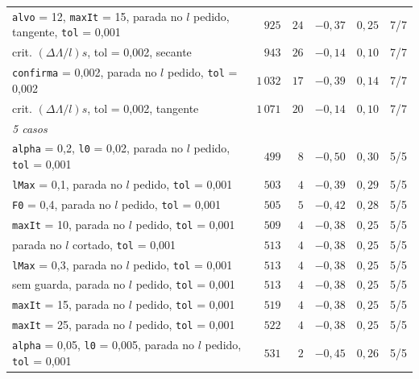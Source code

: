 \documentclass[11pt,a4paper]{article}
\numberwithin{equation}{section}
\begin{document}
{\begin{longtable}{p{7.8cm}rrrrc}
\texttt{alvo} = 12, \texttt{maxIt} = 15, parada no $l$ pedido, tangente, \texttt{tol} = 0,001 & $925$ & $24$ & $-0{,}37$ & $0{,}25$ & 7/7 \\
crit. $(\Delta\Lambda/l)s$, tol = 0,002, secante & $943$ & $26$ & $-0{,}14$ & $0{,}10$ & 7/7 \\
\texttt{confirma} = 0,002, parada no $l$ pedido, \texttt{tol} = 0,002 & $1\,032$ & $17$ & $-0{,}39$ & $0{,}14$ & 7/7 \\
crit. $(\Delta\Lambda/l)s$, tol = 0,002, tangente & $1\,071$ & $20$ & $-0{,}14$ & $0{,}10$ & 7/7 \\
\multicolumn{6}{l}{\textit{5 casos}} \\
\texttt{alpha} = 0,2, \texttt{l0} = 0,02, parada no $l$ pedido, \texttt{tol} = 0,001 & $499$ & $8$ & $-0{,}50$ & $0{,}30$ & 5/5 \\
\texttt{lMax} = 0,1, parada no $l$ pedido, \texttt{tol} = 0,001 & $503$ & $4$ & $-0{,}39$ & $0{,}29$ & 5/5 \\
\texttt{F0} = 0,4, parada no $l$ pedido, \texttt{tol} = 0,001 & $505$ & $5$ & $-0{,}42$ & $0{,}28$ & 5/5 \\
\texttt{maxIt} = 10, parada no $l$ pedido, \texttt{tol} = 0,001 & $509$ & $4$ & $-0{,}38$ & $0{,}25$ & 5/5 \\
parada no $l$ cortado, \texttt{tol} = 0,001 & $513$ & $4$ & $-0{,}38$ & $0{,}25$ & 5/5 \\
\texttt{lMax} = 0,3, parada no $l$ pedido, \texttt{tol} = 0,001 & $513$ & $4$ & $-0{,}38$ & $0{,}25$ & 5/5 \\
sem guarda, parada no $l$ pedido, \texttt{tol} = 0,001 & $513$ & $4$ & $-0{,}38$ & $0{,}25$ & 5/5 \\
\texttt{maxIt} = 15, parada no $l$ pedido, \texttt{tol} = 0,001 & $519$ & $4$ & $-0{,}38$ & $0{,}25$ & 5/5 \\
\texttt{maxIt} = 25, parada no $l$ pedido, \texttt{tol} = 0,001 & $522$ & $4$ & $-0{,}38$ & $0{,}25$ & 5/5 \\
\texttt{alpha} = 0,05, \texttt{l0} = 0,005, parada no $l$ pedido, \texttt{tol} = 0,001 & $531$ & $2$ & $-0{,}45$ & $0{,}26$ & 5/5 \\
\end{longtable}
}
\end{document}

